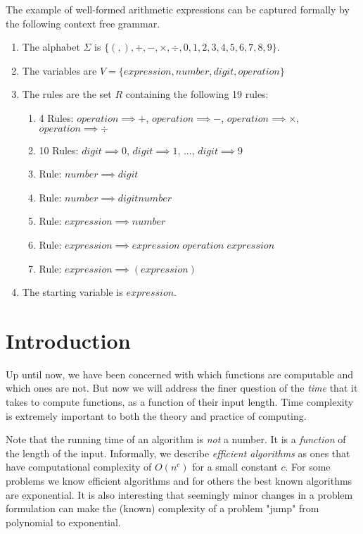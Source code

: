 \documentclass{article}
\begin{document}
  \begin{example}
  The example of well-formed arithmetic expressions can be captured formally by the following context free grammar. 
  \begin{enumerate}
      \item The alphabet $\Sigma$ is $\{(, ), +, -, \times, \div, 0, 1, 2, 3, 4, 5, 6, 7, 8, 9\}$. 
      \item The variables are $V = \{expression, number, digit, operation\}$
      \item The rules are the set $R$ containing the following 19 rules: 
      \begin{enumerate}
          \item 4 Rules: $operation \implies +$, $operation \implies -$, $operation \implies \times$, $operation \implies \div$
          \item 10 Rules: $digit \implies 0$, $digit \implies 1$, ..., $digit \implies 9$
          \item Rule: $number \implies digit$
          \item Rule: $number \implies digit number$
          \item Rule: $expression \implies number$
          \item Rule: $expression \implies expression\; operation\; expression$
          \item Rule: $expression \implies (expression)$
      \end{enumerate}
      \item The starting variable is $expression$.
  \end{enumerate}
  \end{example}

\section{Introduction}

  Up until now, we have been concerned with which functions are computable and which ones are not. But now we will address the finer question of the \textit{time} that it takes to compute functions, as a function of their input length. Time complexity is extremely important to both the theory and practice of computing. 

  Note that the running time of an algorithm is \textit{not} a number. It is a \textit{function} of the length of the input. Informally, we describe \textit{efficient algorithms} as ones that have computational complexity of $O(n^c)$ for a small constant $c$. For some problems we know efficient algorithms and for others the best known algorithms are exponential. It is also interesting that seemingly minor changes in a problem formulation can make the (known) complexity of a problem "jump" from polynomial to exponential. 
\end{document}
